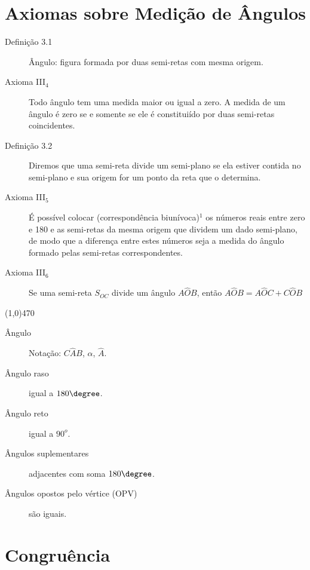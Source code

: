 \section{Axiomas sobre Medição de Ângulos}

\begin{description}
  \item[Definição 3.1] Ângulo: figura formada por duas semi-retas com mesma
    origem.

  \item[Axioma III$_{4}$] Todo ângulo tem uma medida maior ou igual a zero. A
    medida de um ângulo é zero se e somente se ele é constituiído por duas
    semi-retas coincidentes.

  \item[Definição 3.2] Diremos que uma semi-reta divide um semi-plano se ela
    estiver contida no semi-plano e sua origem for um ponto da reta que o
    determina.

  \item[Axioma III$_{5}$] É possível colocar (correspondência biunívoca)$^1$
    os números reais entre zero e 180 e as semi-retas da mesma origem que
    dividem um dado semi-plano, de modo que a diferença entre estes números
    seja a medida do ângulo formado pelas semi-retas correspondentes.

  \item[Axioma III$_6$] Se uma semi-reta $S_{OC}$ divide um ângulo $A\hat{O}B$,
    então $A\hat{O}B = A\hat{O}C + C\hat{O}B$
\end{description}

\line(1,0){470}

\begin{description}
  \item[Ângulo] Notação: $C\hat{A}B$, $\alpha$, $\hat{A}$.
  \item[Ângulo raso] igual a $180\degree$.
  \item[Ângulo reto] igual a $90^o$.
  \item[Ângulos suplementares] adjacentes com soma $180\degree$.
  \item[Ângulos opostos pelo vértice (OPV)] são iguais.
\end{description}

\section{Congruência}

